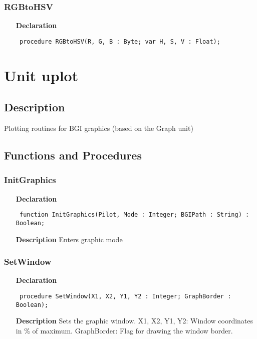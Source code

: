 \documentclass[12pt,a4paper,oneside]{report}
\newcommand{\declarationitem}[1]{\textbf{#1}}
\newcommand{\descriptiontitle}[1]{\textbf{#1}}
\newcommand{\code}[1]{\texttt{#1}}
\begin{document}
\subsubsection{RGBtoHSV}
\label{uhsvrgb-RGBtoHSV}
\begin{itemize}\item[\declarationitem{Declaration}\hfill]
	\begin{flushleft}
		\code{
			procedure RGBtoHSV(R, G, B : Byte; var H, S, V : Float);}
		
	\end{flushleft}
	
\end{itemize}
\section{Unit uplot}
\label{uplot}
\subsection{Description}
Plotting routines for BGI graphics (based on the Graph unit) 
\subsection{Functions and Procedures}
\subsubsection{InitGraphics}
\label{uplot-InitGraphics}
\begin{itemize}\item[\declarationitem{Declaration}\hfill]
	\begin{flushleft}
		\code{
			function InitGraphics(Pilot, Mode : Integer; BGIPath : String) : Boolean;}
		
	\end{flushleft}
	
	\par
	\item[\descriptiontitle{Description}]
	Enters graphic mode
\end{itemize}
\subsubsection{SetWindow}
\label{uplot-SetWindow}
\begin{itemize}\item[\declarationitem{Declaration}\hfill]
	\begin{flushleft}
		\code{
			procedure SetWindow(X1, X2, Y1, Y2 : Integer; GraphBorder : Boolean);}
		
	\end{flushleft}
	
	\par
	\item[\descriptiontitle{Description}]
	Sets the graphic window. X1, X2, Y1, Y2: Window coordinates in {\%} of maximum. GraphBorder: Flag for drawing the window border.
	
\end{itemize}
\end{document}
